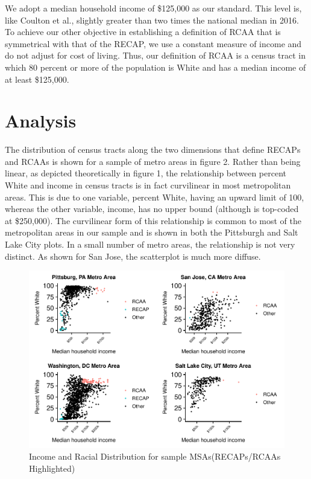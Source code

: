 \documentclass[11pt,]{article}
\begin{document}
We adopt a median household income of \$125,000 as our standard. This
level is, like Coulton et al., slightly greater than two times the
national median in 2016. To achieve our other objective in establishing
a definition of RCAA that is symmetrical with that of the RECAP, we use
a constant measure of income and do not adjust for cost of living. Thus,
our definition of RCAA is a census tract in which 80 percent or more of
the population is White and has a median income of at least \$125,000.

\hypertarget{analysis}{%
\section{Analysis}\label{analysis}}

The distribution of census tracts along the two dimensions that define
RECAPs and RCAAs is shown for a sample of metro areas in figure 2.
Rather than being linear, as depicted theoretically in figure 1, the
relationship between percent White and income in census tracts is in
fact curvilinear in most metropolitan areas. This is due to one
variable, percent White, having an upward limit of 100, whereas the
other variable, income, has no upper bound (although is top-coded at
\$250,000). The curvilinear form of this relationship is common to most
of the metropolitan areas in our sample and is shown in both the
Pittsburgh and Salt Lake City plots. In a small number of metro areas,
the relationship is not very distinct. As shown for San Jose, the
scatterplot is much more diffuse.

\begin{figure}
\centering
\includegraphics{GDW-RCAA-2019_files/figure-latex/fig2-1.pdf}
\caption{Income and Racial Distribution for sample MSAs(RECAPs/RCAAs
Highlighted)}
\end{figure}
\end{document}
